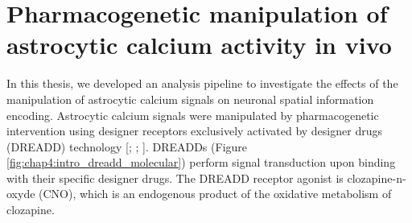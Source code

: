 \section{Pharmacogenetic manipulation of astrocytic calcium activity in vivo}
\label{chap4:sec:3:astro_dreadd}
In this thesis, we developed an analysis pipeline to investigate the effects of the manipulation of astrocytic calcium signals on neuronal spatial information encoding. 
Astrocytic calcium signals were manipulated by pharmacogenetic intervention using designer receptors exclusively activated by designer drugs (DREADD) technology [\cite{roth2016dreadds}; \cite{armbruster2005creation}; \cite{armbruster2007evolving}]. 
DREADDs (Figure \ref{fig:chap4:intro_dreadd_molecular}) perform signal transduction upon binding with their specific designer drugs. 
The DREADD receptor agonist is clozapine-n-oxyde (CNO), which is an endogenous product of the oxidative metabolism of clozapine.
